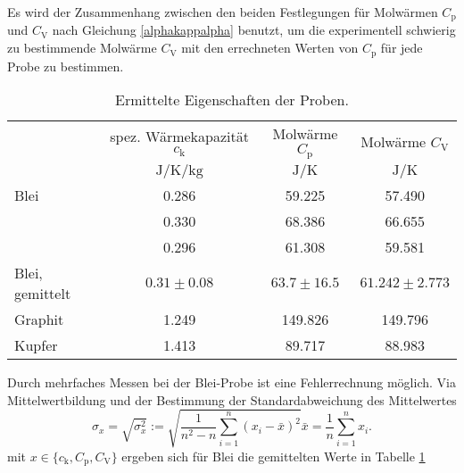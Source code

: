 Es wird der Zusammenhang zwischen den beiden Festlegungen für Molwärmen $C_\text{p}$ und $C_\text{V}$ nach Gleichung \eqref{alphakappalpha} benutzt, um
die experimentell schwierig zu bestimmende Molwärme $C_\text{V}$ mit den errechneten Werten von $C_\text{p}$ für jede Probe zu bestimmen.
\begin{table}[htbp]
	\centering
	\begin{tabular}{lccc}
		\toprule
		&{spez. Wärmekapazität $c_\text{k}$}& {Molwärme $C_\text{p}$}  &{Molwärme $C_\text{V}$}\\
		&{$\si{\joule\per\kelvin\per\kilo\gram}$}  &{$\si{\joule\per\kelvin}$}& {$\si{\joule\per\kelvin}$}\\
		\midrule
		{Blei}	&0.286	&59.225	& 57.490\\
				&0.330	&68.386	& 66.655\\
				&0.296	&61.308	& 59.581\\
		{Blei, gemittelt}	&$0.31\pm0.08$	&$63.7\pm16.5$	&$61.242\pm2.773$\\
		{Graphit}&1.249 &149.826& 149.796\\
		{Kupfer}&1.413	&89.717	& 88.983\\
		\bottomrule
	\end{tabular}
	\caption{Ermittelte Eigenschaften der Proben.}
	\label{wert:proben}
\end{table}
Durch mehrfaches Messen bei der Blei-Probe ist eine Fehlerrechnung möglich.
Via Mittelwertbildung und der Bestimmung der Standardabweichung des Mittelwertes
\begin{subequations}
	\begin{equation}
		\sigma_x = \sqrt{\sigma_x^2} := \sqrt{\frac{1}{n^2-n} \sum_{i=1}^n{(x_i-\bar{x})^2}}
	\end{equation}
	\begin{equation}
		\bar{x} = \frac{1}{n} \sum_{i=1}^n{x_i}.
	\end{equation}
\end{subequations}
mit $x\in\{c_\mathup{k},C_\mathup{p},C_\mathup{V}\}$ ergeben sich für Blei die gemittelten Werte in Tabelle \ref{wert:proben}
